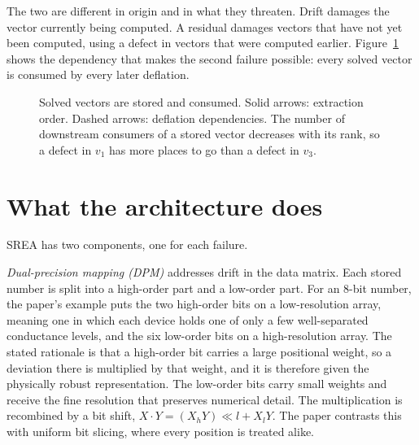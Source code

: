 \documentclass[11pt]{article}
\theoremstyle{definition}
\theoremstyle{remark}
\begin{document}
The two are different in origin and in what they threaten. Drift damages the vector currently being computed. A residual damages vectors that have not yet been computed, using a defect in vectors that were computed earlier. Figure~\ref{fig:chain} shows the dependency that makes the second failure possible: every solved vector is consumed by every later deflation.

\begin{figure}[t]
\centering
{}
\caption{Solved vectors are stored and consumed. Solid arrows: extraction order. Dashed arrows: deflation dependencies. The number of downstream consumers of a stored vector decreases with its rank, so a defect in $v_1$ has more places to go than a defect in $v_3$.}
\label{fig:chain}
\end{figure}

\section{What the architecture does}

SREA has two components, one for each failure.

\emph{Dual-precision mapping (DPM)} addresses drift in the data matrix. Each stored number is split into a high-order part and a low-order part. For an 8-bit number, the paper's example puts the two high-order bits on a low-resolution array, meaning one in which each device holds one of only a few well-separated conductance levels, and the six low-order bits on a high-resolution array. The stated rationale is that a high-order bit carries a large positional weight, so a deviation there is multiplied by that weight, and it is therefore given the physically robust representation. The low-order bits carry small weights and receive the fine resolution that preserves numerical detail. The multiplication is recombined by a bit shift, $X\cdot Y=(X_hY)\ll l+X_lY$. The paper contrasts this with uniform bit slicing, where every position is treated alike.
\end{document}
